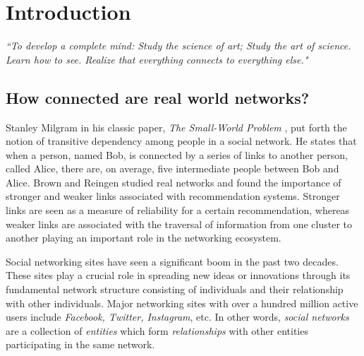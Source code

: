 


\chapter{Introduction}\label{chap:intro}


{\textit{``To develop a complete mind: Study the science of art; Study the art of science. Learn how to see. Realize that everything connects to everything else."}}





\section{How connected are real world networks?} \label{sec:work}

Stanley Milgram in his classic paper, \emph{The Small-World Problem} \cite{milgram}, put forth the notion of transitive dependency among people in a social network. He states that when a person, named Bob, is connected by a series of links to another person, called Alice, there are, on average, five intermediate people between Bob and Alice. 
Brown and Reingen \cite{brown} studied real networks and found the importance of stronger and weaker links associated with recommendation systems. Stronger links are seen as a measure of reliability for a certain recommendation, whereas weaker links are associated with the traversal of information from one cluster to another playing an important role in the networking ecosystem.


Social networking sites have seen a significant boom in the past two decades. These sites play a crucial role in spreading new ideas or innovations through its fundamental network structure consisting of individuals and their relationship with other individuals. Major networking sites with over a hundred million active users include \emph{Facebook, Twitter, Instagram}, etc. In other words, \emph{social networks} are a collection of \emph{entities} which form \emph{relationships} with other entities participating in the same network. 


